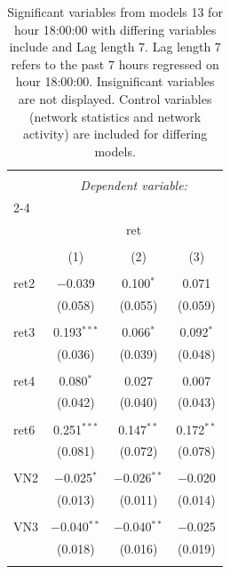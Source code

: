 
\begin{table}[!htbp] \centering 
  \caption{Significant variables from models 13 for hour 18:00:00 with differing variables include 
                               and Lag length 7. Lag length 7 refers to the past 7 hours regressed on hour 18:00:00. 
                               Insignificant variables are not displayed. 
                               Control variables (network statistics and network activity) are 
                               included for differing models.} 
  \label{RVmodels2_t_hourlagged5} 
\scriptsize 
\begin{tabular}{@{\extracolsep{5pt}}lccc} 
\\[-1.8ex]\hline 
\hline \\[-1.8ex] 
 & \multicolumn{3}{c}{\textit{Dependent variable:}} \\ 
\cline{2-4} 
\\[-1.8ex] & \multicolumn{3}{c}{ret} \\ 
\\[-1.8ex] & (1) & (2) & (3)\\ 
\hline \\[-1.8ex] 
 ret2 & $-$0.039 & 0.100$^{*}$ & 0.071 \\ 
  & (0.058) & (0.055) & (0.059) \\ 
  & & & \\ 
 ret3 & 0.193$^{***}$ & 0.066$^{*}$ & 0.092$^{*}$ \\ 
  & (0.036) & (0.039) & (0.048) \\ 
  & & & \\ 
 ret4 & 0.080$^{*}$ & 0.027 & 0.007 \\ 
  & (0.042) & (0.040) & (0.043) \\ 
  & & & \\ 
 ret6 & 0.251$^{***}$ & 0.147$^{**}$ & 0.172$^{**}$ \\ 
  & (0.081) & (0.072) & (0.078) \\ 
  & & & \\ 
 VN2 & $-$0.025$^{*}$ & $-$0.026$^{**}$ & $-$0.020 \\ 
  & (0.013) & (0.011) & (0.014) \\ 
  & & & \\ 
 VN3 & $-$0.040$^{**}$ & $-$0.040$^{**}$ & $-$0.025 \\ 
  & (0.018) & (0.016) & (0.019) \\ 
  & & & \\ 

\end{tabular}
\end{table}
